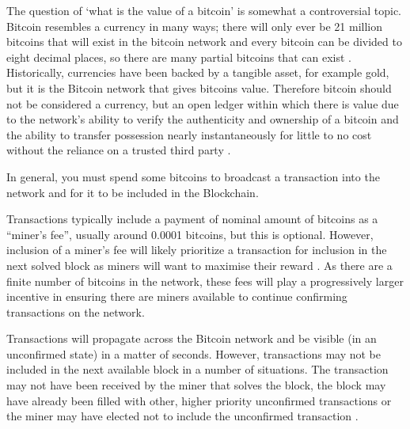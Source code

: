\documentclass{article}
\begin{document}
The question of `what is the value of a bitcoin' is somewhat a controversial topic. Bitcoin resembles a currency in many ways; there will only ever be 21 million bitcoins that will exist in the bitcoin network and every bitcoin can be divided to eight decimal places, so there are many partial bitcoins that can exist \citep{8_itbit_2015}. Historically, currencies have been backed by a tangible asset, for example gold, but it is the Bitcoin network that gives bitcoins value. Therefore bitcoin should not be considered a currency, but an open ledger within which there is value due to the network’s ability to verify the authenticity and ownership of a bitcoin and the ability to transfer possession nearly instantaneously for little to no cost without the reliance on a trusted third party \citep{9_kaye_scholer_2016}.

In general, you must spend some bitcoins to broadcast a transaction into the network and for it to be included in the Blockchain. 

Transactions typically include a payment of nominal amount of bitcoins as a ``miner’s fee'', usually around 0.0001 bitcoins, but this is optional. However, inclusion of a miner’s fee will likely prioritize a transaction for inclusion in the next solved block as miners will want to maximise their reward \citep{9_kaye_scholer_2016}. As there are a finite number of bitcoins in the network, these fees will play a progressively larger incentive in ensuring there are miners available to continue confirming transactions on the network.

Transactions will propagate across the Bitcoin network and be visible (in an unconfirmed state) in a matter of seconds. However, transactions may not be included in the next available block in a number of situations. The transaction may not have been received by the miner that solves the block, the block may have already been filled with other, higher priority unconfirmed transactions or the miner may have elected not to include the unconfirmed transaction \citep{9_kaye_scholer_2016}.

\printbibliography
\end{document}
